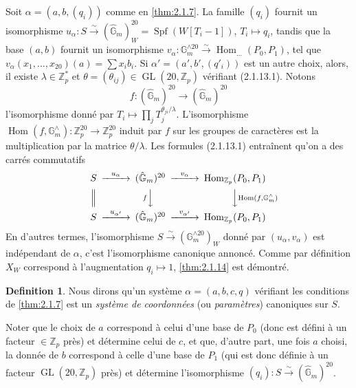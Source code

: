 \documentclass[12pt,a4paper]{article}
\theoremstyle{plain}
\theoremstyle{definition}
\newtheorem{definition}[theorem]{Definition}
\theoremstyle{remark}
\DeclareMathOperator{\Hom}{Hom}
\DeclareMathOperator{\Spf}{Spf}
\providecommand{\Hom}{\operatorname{Hom}}
\providecommand{\GL}{\operatorname{GL}}
\begin{document}
Soit $\alpha = (a, b, (q_i))$ comme en \ref{thm:2.1.7}. La famille $(q_i)$ fournit un isomorphisme $u_\alpha : S \xrightarrow{\sim} (\hat{\mathbb{G}}_m)^{20}_W = \Spf(W[T_i - 1])$, $T_i \mapsto q_i$, tandis que la base $(a, b)$ fournit un isomorphisme $v_\alpha : \mathbb{G}_m^{\wedge 20} \xrightarrow{\sim} \Hom_{\ldots}(P_0, P_1)$, tel que $v_\alpha(x_1, \ldots, x_{20})(a) = \sum x_i b_i$. Si $\alpha' = (a', b', (q'_i))$ est un autre choix, alors, il existe $\lambda \in \mathbb{Z}_p^*$ et $\theta = (\theta_{ij}) \in \GL(20, \mathbb{Z}_p)$ v\'erifiant (2.1.13.1). Notons
\[
f : (\hat{\mathbb{G}}_m)^{20} \longrightarrow (\hat{\mathbb{G}}_m)^{20}
\]
l'isomorphisme donn\'e par $T_i \mapsto \prod_j T_j^{\theta_{ji}/\lambda}$. L'isomorphisme $\Hom(f, \mathbb{G}_m^{\wedge}) : \mathbb{Z}_p^{20} \to \mathbb{Z}_p^{20}$ induit par $f$ sur les groupes de caract\`eres est la multiplication par la matrice $\theta/\lambda$. Les formules (2.1.13.1) entra\^inent qu'on a des carr\'es commutatifs
\[
\begin{CD}
S @>{u_\alpha}>> (\hat{\mathbb{G}}_m)^{20} @>{v_\alpha}>> \Hom_{\mathbb{Z}_p}(P_0, P_1) \\
@| @V{f}VV @VV{\Hom(f, \mathbb{G}_m^{\wedge})}V \\
S @>{u_{\alpha'}}>> (\hat{\mathbb{G}}_m)^{20} @>{v_{\alpha'}}>> \Hom_{\mathbb{Z}_p}(P_0, P_1)
\end{CD}
\]
En d'autres termes, l'isomorphisme $S \xrightarrow{\sim} (\mathbb{G}_m^{\wedge 20})_W$ donn\'e par $(u_\alpha, v_\alpha)$ est ind\'ependant de $\alpha$, c'est l'isomorphisme canonique annonc\'e. Comme par d\'efinition $X_W$ correspond \`a l'augmentation $q_i \mapsto 1$, \ref{thm:2.1.14} est d\'emontr\'e.

\begin{definition}\label{def:2.1.15}
Nous dirons qu'un syst\`eme $\alpha = (a, b, c, q)$ v\'erifiant les conditions de \ref{thm:2.1.7} est un \emph{syst\`eme de coordonn\'ees} (ou \emph{param\`etres}) canoniques sur $S$.
\end{definition}

Noter que le choix de $a$ correspond \`a celui d'une base de $P_0$ (donc est d\'efini \`a un facteur $\in \mathbb{Z}_p$ pr\`es) et d\'etermine celui de $c$, et que, d'autre part, une fois $a$ choisi, la donn\'ee de $b$ correspond \`a celle d'une base de $P_1$ (qui est donc d\'efinie \`a un facteur $\GL(20, \mathbb{Z}_p)$ pr\`es) et d\'etermine l'isomorphisme $(q_i) : S \xrightarrow{\sim} (\hat{\mathbb{G}}_m)^{20}$.
\end{document}
